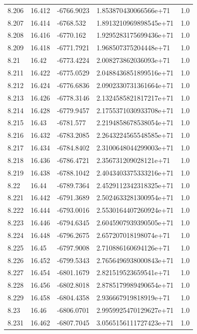 \begin{tabular}{lllll}
8.206 & 16.412 & -6766.9023 & 1.853870430066566e+71 & 1.0 \\
8.207 & 16.414 & -6768.532 & 1.8913210969898545e+71 & 1.0 \\
8.208 & 16.416 & -6770.162 & 1.9295283175699436e+71 & 1.0 \\
8.209 & 16.418 & -6771.7921 & 1.968507375204448e+71 & 1.0 \\
8.21 & 16.42 & -6773.4224 & 2.008273862036093e+71 & 1.0 \\
8.211 & 16.422 & -6775.0529 & 2.0488436851899516e+71 & 1.0 \\
8.212 & 16.424 & -6776.6836 & 2.0902330731361664e+71 & 1.0 \\
8.213 & 16.426 & -6778.3146 & 2.1324585821817217e+71 & 1.0 \\
8.214 & 16.428 & -6779.9457 & 2.1755371030933708e+71 & 1.0 \\
8.215 & 16.43 & -6781.577 & 2.2194858678538054e+71 & 1.0 \\
8.216 & 16.432 & -6783.2085 & 2.2643224565548585e+71 & 1.0 \\
8.217 & 16.434 & -6784.8402 & 2.3100648044299003e+71 & 1.0 \\
8.218 & 16.436 & -6786.4721 & 2.356731209028121e+71 & 1.0 \\
8.219 & 16.438 & -6788.1042 & 2.4043403375333216e+71 & 1.0 \\
8.22 & 16.44 & -6789.7364 & 2.4529112342318325e+71 & 1.0 \\
8.221 & 16.442 & -6791.3689 & 2.5024633281300954e+71 & 1.0 \\
8.222 & 16.444 & -6793.0016 & 2.5530164407260924e+71 & 1.0 \\
8.223 & 16.446 & -6794.6345 & 2.6045907939390505e+71 & 1.0 \\
8.224 & 16.448 & -6796.2675 & 2.657207018198074e+71 & 1.0 \\
8.225 & 16.45 & -6797.9008 & 2.710886160694126e+71 & 1.0 \\
8.226 & 16.452 & -6799.5343 & 2.7656496938000843e+71 & 1.0 \\
8.227 & 16.454 & -6801.1679 & 2.821519523659541e+71 & 1.0 \\
8.228 & 16.456 & -6802.8018 & 2.8785179989490654e+71 & 1.0 \\
8.229 & 16.458 & -6804.4358 & 2.936667919818919e+71 & 1.0 \\
8.23 & 16.46 & -6806.0701 & 2.9959925470129627e+71 & 1.0 \\
8.231 & 16.462 & -6807.7045 & 3.0565156111727423e+71 & 1.0 \\

\end{tabular}
